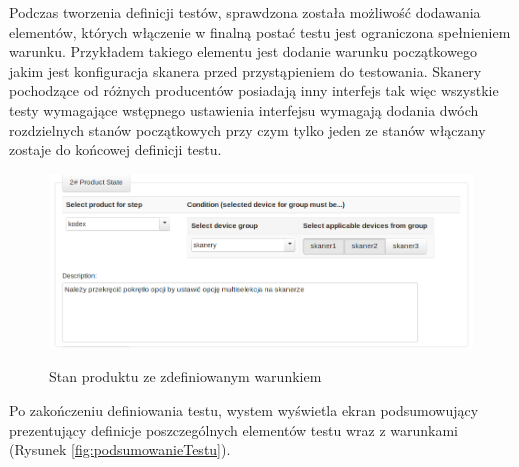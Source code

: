   
  
  Podczas tworzenia definicji testów, sprawdzona została możliwość dodawania elementów, których włączenie w finalną postać testu jest ograniczona spełnieniem warunku. Przykładem takiego elementu jest dodanie warunku początkowego jakim jest konfiguracja skanera przed przystąpieniem do testowania. Skanery pochodzące od różnych producentów posiadają inny interfejs tak więc wszystkie testy wymagające wstępnego ustawienia interfejsu wymagają dodania dwóch rozdzielnych stanów początkowych przy czym tylko jeden ze stanów włączany zostaje do końcowej definicji testu.
   \begin{figure}[h]
  \begin{center}
    \includegraphics[scale=0.4]{img/screen/stanProdutuZwyboremWarunku.png}
    \label{fig:stanProduktuZwarunkiem}
    \caption{Stan produktu ze zdefiniowanym warunkiem}
  \end{center}
\end{figure}
\pagebreak

Po zakończeniu definiowania testu, wystem wyświetla ekran podsumowujący prezentujący definicje poszczególnych elementów testu wraz z warunkami (Rysunek \ref{fig:podsumowanieTestu}).


